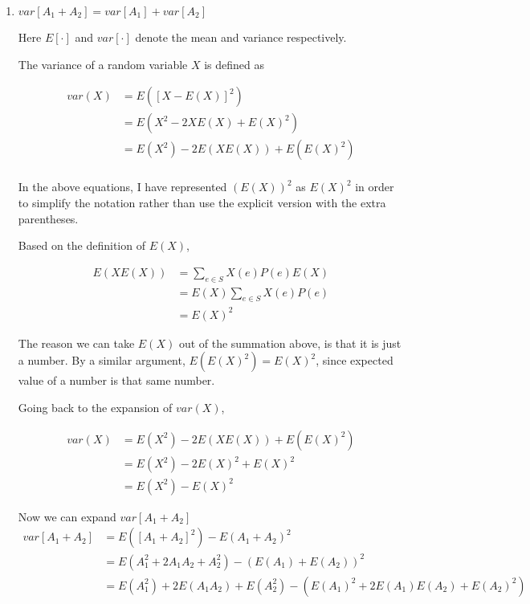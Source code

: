 \begin{enumerate}
  \item $var[A_1 + A_2] = var[A_1] + var[A_2]$
  
  Here $E[\cdot]$ and $var[\cdot]$ denote the mean and variance
  respectively.
  
The variance of a random variable $X$ is defined as 

\begin{equation*}
\begin{aligned}
var(X) &= E(\left[X-E(X)\right]^2)\\
&= E(X^2-2XE(X) + E(X)^2)\\
&= E(X^2) - 2E(XE(X)) + E(E(X)^2)\\
\end{aligned}
\end{equation*} 

In the above equations, I have represented $(E(X))^2$ as $E(X)^2$ in order to simplify the notation rather than use the explicit version with the extra parentheses. 

Based on the definition of $E(X)$,

 \begin{equation*}
\begin{aligned}
E(XE(X)) &= \sum_{e \in S} X(e) P(e) E(X)\\
&= E(X)\sum_{e \in S} X(e) P(e)\\
&= E(X)^2
\end{aligned}
\end{equation*} 

The reason we can take $E(X)$ out of the summation above, is that it is just a number. By a similar argument, $E(E(X)^2) = E(X)^2$, since expected value of a number is that same number.

Going back to the expansion of $var(X)$, 

\begin{equation*}
\begin{aligned}
var(X) &=  E(X^2) - 2E(XE(X)) + E(E(X)^2)\\
&= E(X^2) - 2E(X)^2 + E(X)^2\\
&= E(X^2) - E(X)^2
\end{aligned}
\end{equation*} 

Now we can expand $var [A_1 + A_2]$
\begin{equation*}
\begin{aligned}
var [A_1 + A_2] &= E([A_1 + A_2]^2) - E(A_1 + A_2)^2\\
&= E(A_1^2 + 2A_1A_2 + A_2^2) - (E(A_1) + E(A_2))^2\\
&= E(A_1^2) + 2E(A_1A_2) + E(A_2^2) - (E(A_1)^2 + 2E(A_1)E(A_2) + E(A_2)^2)
\end{aligned}
\end{equation*} 


\end{enumerate}

